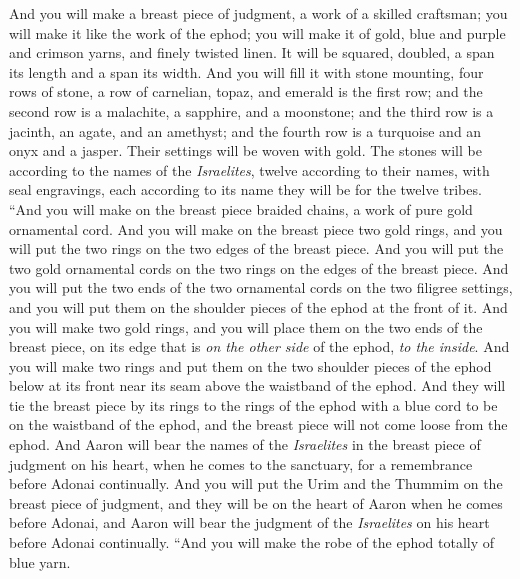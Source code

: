\begin{biblechapter}
\verse And you will make a breast piece of judgment, a work of a skilled craftsman; you will make it like the work of the ephod; you will make it of gold, blue and purple and crimson yarns, and finely twisted linen.
\verse It will be squared, doubled, a span its length and a span its width.
\verse And you will fill it with stone mounting, four rows of stone, a row of carnelian, topaz, and emerald is the first row;
\verse and the second row is a malachite, a sapphire, and a moonstone;
\verse and the third row is a jacinth, an agate, and an amethyst;
\verse and the fourth row is a turquoise and an onyx and a jasper. Their settings will be woven with gold.
\verse The stones will be according to the names of the \textit{Israelites}, twelve according to their names, with seal engravings, each according to its name they will be for the twelve tribes.
\verse “And you will make on the breast piece braided chains, a work of pure gold ornamental cord.
\verse And you will make on the breast piece two gold rings, and you will put the two rings on the two edges of the breast piece.
\verse And you will put the two gold ornamental cords on the two rings on the edges of the breast piece.
\verse And you will put the two ends of the two ornamental cords on the two filigree settings, and you will put them on the shoulder pieces of the ephod at the front of it.
\verse And you will make two gold rings, and you will place them on the two ends of the breast piece, on its edge that is \textit{on the other side} of the ephod, \textit{to the inside}.
\verse And you will make two rings and put them on the two shoulder pieces of the ephod below at its front near its seam above the waistband of the ephod.
\verse And they will tie the breast piece by its rings to the rings of the ephod with a blue cord to be on the waistband of the ephod, and the breast piece will not come loose from the ephod.
\verse And Aaron will bear the names of the \textit{Israelites} in the breast piece of judgment on his heart, when he comes to the sanctuary, for a remembrance before Adonai continually.
\verse And you will put the Urim and the Thummim on the breast piece of judgment, and they will be on the heart of Aaron when he comes before Adonai, and Aaron will bear the judgment of the \textit{Israelites} on his heart before Adonai continually.
\verse “And you will make the robe of the ephod totally of blue yarn.

\end{biblechapter}
